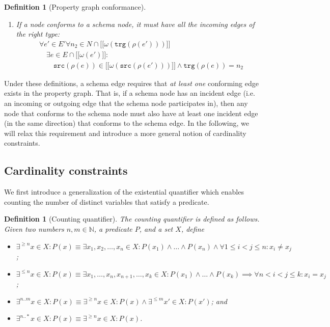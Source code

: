 \documentclass[a4paper]{article}
\newtheorem{definition}[theorem]{Definition}
\newcommand{\N}{\mathbb{N}}
\newcommand{\src}{\mathtt{src}}
\newcommand{\trg}{\mathtt{trg}}
\newcommand{\lsem}{\ensuremath{[\![}}
\newcommand{\rsem}{\ensuremath{]\!]}}
\newcommand{\sem}[1]{\ensuremath{\lsem #1 \rsem}}
\begin{document}
\begin{definition}[Property graph conformance]
\begin{enumerate}
    \item If a node conforms to a schema node, it must have all the incoming edges of the right type:
    \begin{align*}
      &\forall e' \in E' \forall n_2 \in N \cap \sem{\omega(\trg(\rho(e')))}\\
      &\quad\exists e \in E \cap \sem{\omega(e')} :\\
      &\quad\quad \src(\rho(e)) \in \sem{\omega(\src(\rho(e')))} \wedge \trg(\rho(e)) = n_2
    \end{align*}
  \end{enumerate}
\end{definition}

Under these definitions, a schema edge requires that \emph{at least one} conforming edge exists in the property graph. That is, if a schema node has an incident edge (i.e. an incoming or outgoing edge that the schema node participates in), then any node that conforms to the schema node must also have at least one incident edge (in the same direction) that conforms to the schema edge. In the following, we will relax this requirement and introduce a more general notion of cardinality constraints.

\subsection{Cardinality constraints}

We first introduce a generalization of the existential quantifier which enables counting the number of distinct variables that satisfy a predicate.

\begin{definition}[Counting quantifier]
  The \emph{counting quantifier} is defined as follows. Given two numbers $n, m \in \N$, a predicate $P$, and a set $X$, define
  \begin{itemize}
    \item $\exists^{\geq n} x \in X : P(x) \equiv \exists x_1, x_2, \ldots, x_n \in X : P(x_1) \wedge \ldots \wedge P(x_n) \wedge \forall 1 \leq i < j \leq n : x_i \neq x_j$;
    \item $\exists^{\leq n} x \in X : P(x) \equiv \exists x_1, \ldots, x_n, x_{n+1}, \ldots, x_k \in X : P(x_1) \wedge \ldots \wedge P(x_k) \implies \forall n < i < j \leq k : x_i = x_j$;
    \item $\exists^{n..m} x \in X : P(x) \equiv \exists^{\geq n} x \in X : P(x) \wedge \exists^{\leq m} x' \in X : P(x')$; and
    \item $\exists^{n..*} x \in X : P(x) \equiv \exists^{\geq n} x \in X : P(x)$.
  \end{itemize}
\end{definition}
\end{document}
